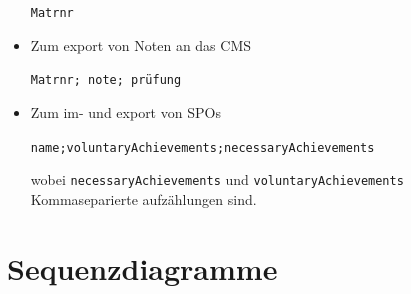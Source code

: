 \documentclass[parskip=full]{scrartcl}
\begin{document}
\begin{itemize}
   \begin{tcolorbox}[enhanced jigsaw,
 colback=testgrauRGB %
 coltext=black, %
 sharp corners, %
 colframe=black, %
 boxrule=0pt %
 ]
 \texttt{Matrnr}
  \end{tcolorbox}
   \item Zum export von Noten an das CMS \\ \begin{tcolorbox}[enhanced
  jigsaw,
 colback=testgrauRGB %
 coltext=black, %
 sharp corners, %
 colframe=black, %
 boxrule=0pt %
 ]
 \texttt{Matrnr; note; prüfung}
  \end{tcolorbox}
     \item Zum im- und export von SPOs \\ \begin{tcolorbox}[enhanced
  jigsaw,
 colback=testgrauRGB %
 coltext=black, %
 sharp corners, %
 colframe=black, %
 boxrule=0pt %
 ]
 \texttt{name;voluntaryAchievements;necessaryAchievements}
  \end{tcolorbox}
  wobei \texttt{necessaryAchievements} und \texttt{voluntaryAchievements}
  Kommaseparierte aufzählungen sind.
\end{itemize}




\section{Sequenzdiagramme}



 
\end{document}
